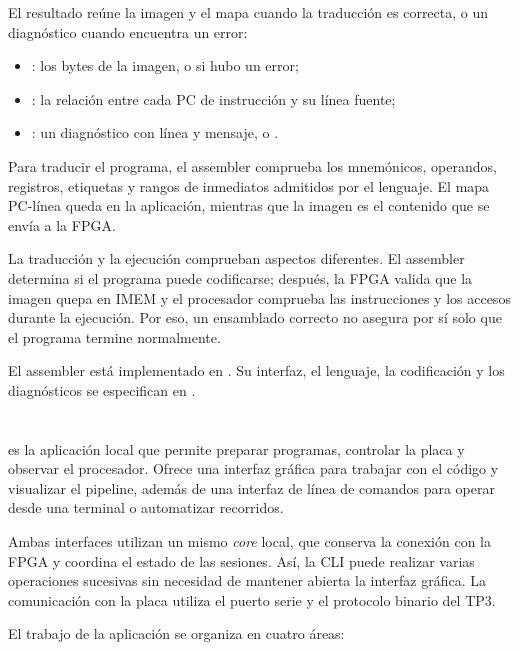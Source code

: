 El resultado reúne la imagen y el mapa cuando la traducción es correcta, o un
diagnóstico cuando encuentra un error:

\begin{itemize}
  \item {}: los bytes de la imagen, o  si hubo un error;
  \item {}: la relación entre cada PC de instrucción y su línea
  fuente;
  \item {}: un diagnóstico con línea y mensaje, o .
\end{itemize}

Para traducir el programa, el assembler comprueba los mnemónicos, operandos,
registros, etiquetas y rangos de inmediatos admitidos por el lenguaje. El mapa
PC-línea queda en la aplicación, mientras que la imagen es el contenido que se
envía a la FPGA.

La traducción y la ejecución comprueban aspectos diferentes. El assembler
determina si el programa puede codificarse; después, la FPGA valida que la
imagen quepa en IMEM y el procesador comprueba las instrucciones y los accesos
durante la ejecución. Por eso, un ensamblado correcto no asegura por sí solo
que el programa termine normalmente.

El assembler está implementado en . Su
interfaz, el lenguaje, la codificación y los diagnósticos se especifican en
.

\section{\texorpdfstring{}{viewrv}}

 es la aplicación local que permite preparar programas, controlar
la placa y observar el procesador. Ofrece una interfaz gráfica para trabajar
con el código y visualizar el pipeline, además de una interfaz de línea de
comandos para operar desde una terminal o automatizar recorridos.

Ambas interfaces utilizan un mismo \emph{core} local, que conserva la conexión
con la FPGA y coordina el estado de las sesiones. Así, la CLI puede realizar
varias operaciones sucesivas sin necesidad de mantener abierta la interfaz
gráfica. La comunicación con la placa utiliza el puerto serie y el protocolo
binario del TP3.

El trabajo de la aplicación se organiza en cuatro áreas:

